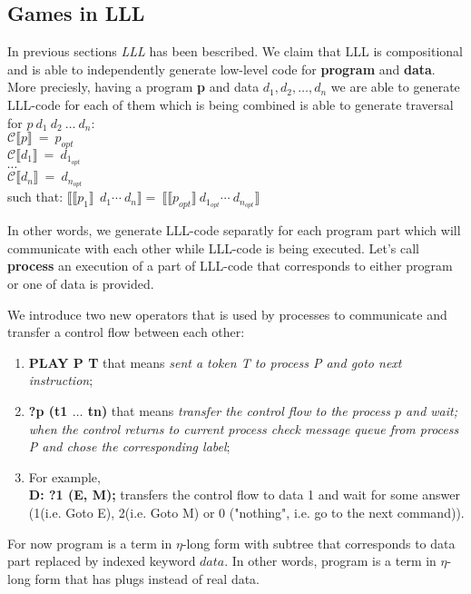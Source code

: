 \documentclass[a4paper, 10pt]{article}
\begin{document}
\subsection{Games in \textbf{LLL}}
In previous sections \textit{LLL} has been bescribed. We claim that LLL is compositional and is able to independently generate low-level code for \textbf{program} and \textbf{data}. More preciesly, having a program \textbf{p} and data \textbf{$d_1, d_2, \dots, d_n$} we are able to generate LLL-code for each of them which is being combined is able to generate traversal for $p\ d_1\ d_2\ \dots\ d_n$:\\
$\mathcal{C}\llbracket p \rrbracket\ =\ p_{opt}$\\
$\mathcal{C}\llbracket d_1 \rrbracket\ =\ d_{1_{opt}}$\\
$\cdots$\\
$\mathcal{C}\llbracket d_n \rrbracket\ =\ d_{n_{opt}}$\\
such that: 
$\llbracket \llbracket p_1 \rrbracket\ \ d_1 \cdots \ d_n \rrbracket=\ \llbracket \llbracket p_{opt} \rrbracket\ d_{1_{opt}}\cdots\ d_{n_{opt}}\rrbracket$

In other words, we generate LLL-code separatly for each program part which will communicate with each other while LLL-code is being executed. Let's call \textbf{process} an execution of a part of LLL-code that corresponds to either program or one of data is provided.

We introduce two new operators that is used by processes to communicate and transfer a control flow between each other:
\begin{enumerate}
\item \textbf{PLAY P T} that means \textit{sent a token T to process P and goto next instruction};
\item \textbf{?p (t1 $\dots$ tn)} that means \textit{transfer the control flow to the process $p$ and wait; when the control returns to current process check message queue from process P and chose the corresponding label};
\item For example,\\
\textbf{D: ?1 (E, M);} transfers the control flow to data 1 and wait for some answer (1(i.e. Goto E), 2(i.e. Goto M) or 0 ("nothing", i.e. go to the next command)).
\end{enumerate}

For now program is a term in $\eta$-long form with subtree that corresponds to data part replaced by indexed keyword $data$. In other words, program is a term in $\eta$-long form that has plugs instead of real data.
\end{document}

